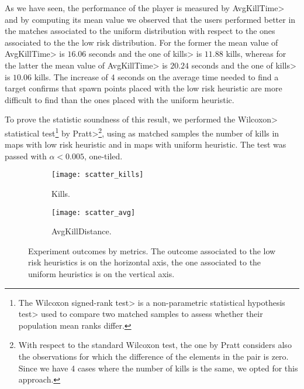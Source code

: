 \par

As we have seen, the performance of the player is measured by \<AvgKillTime> and by computing its mean value we observed that the users performed better in the matches associated to the uniform distribution with respect to the ones associated to the the low risk distribution. For the former the mean value of \<AvgKillTime> is $16.06$ seconds and the one of \<kills> is $11.88$ kills, whereas for the latter  the mean value of \<AvgKillTime> is $20.24$ seconds and the one of \<kills> is $10.06$ kills. The increase of 4 seconds on the average time needed to find a target confirms that spawn points placed with the low risk heuristic are more difficult to find than the ones placed with the uniform heuristic.

\par

To prove the statistic soundness of this result, we performed the \<Wilcoxon> statistical test\footnote{The \<Wilcoxon signed-rank test> is a \<non-parametric statistical hypothesis test> used to compare two matched samples to assess whether their population mean ranks differ.} by \<Pratt>\footnote{With respect to the standard Wilcoxon test, the one by Pratt considers also the observations for which the difference of the elements in the pair is zero. Since we have 4 cases where the number of kills is the same, we opted for this approach.}, using as matched samples the number of kills in maps with low risk heuristic and in maps with uniform heuristic. The test was passed with $\alpha < 0.005$, one-tiled.

\begin{figure}[h]
 	\centering
  	\begin{subfigure}[t]{0.48\linewidth}
    		\texttt{[image: scatter\_kills]}
     		\caption{Kills.}
		\label{img:scatter_kills}
  	\end{subfigure}
  	\hfill
  	\begin{subfigure}[t]{0.48\linewidth}
    		\texttt{[image: scatter\_avg]}
     		\caption{AvgKillDistance.}
     		\label{img:scatter_avg}
  	\end{subfigure}
	\caption[Experiment outcomes by metrics.]{Experiment outcomes by metrics. The outcome associated to the low risk heuristics is on the horizontal axis, the one associated to the uniform heuristics is on the vertical axis.}
	\label{img:metrics}	
\end{figure}


